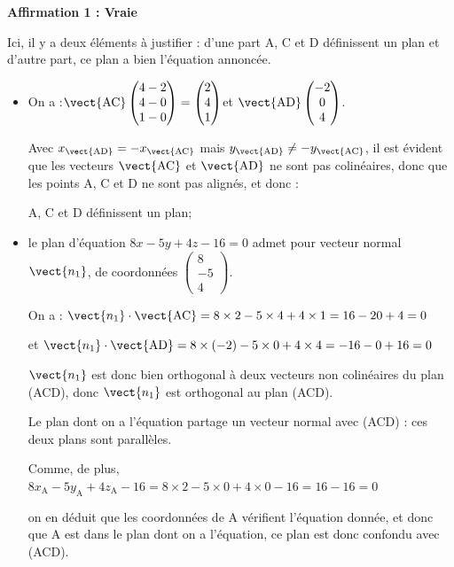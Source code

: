 \medskip

\textbf{Affirmation 1 : Vraie}

Ici, il y a deux éléments à justifier : d'une part A, C et D définissent un plan et d'autre part, ce plan a bien l'équation annoncée.
\begin{itemize}[label=\textbullet]
	\item On a :\quad $\vect{\mathrm{AC}}\begin{pmatrix} 4 - 2\\4 - 0\\1-0 \end{pmatrix} = \begin{pmatrix} 2\\4\\1 \end{pmatrix}$\quad et \quad $\vect{\mathrm{AD}}\begin{pmatrix} -2\\0\\4\end{pmatrix}$.

	Avec $x_{\vect{\mathrm{AD}}} = -x_{\vect{\mathrm{AC}}}$ mais $y_{\vect{\mathrm{AD}} }\neq -y_{\vect{\mathrm{AC}}}$, il est évident que les vecteurs $\vect{\mathrm{AC}}$ et $\vect{\mathrm{AD}}$ ne sont pas colinéaires, donc que les points A, C et D ne sont pas alignés, et donc :

	A, C et D définissent un plan;

	\item le plan d'équation $8x-5y+4z-16=0$ admet pour vecteur normal $\vect{n_1}$, de coordonnées $\begin{pmatrix}8\\-5\\4\end{pmatrix}$.

	On a : \quad $\vect{n_1}\cdot\vect{\mathrm{AC}} = 8\times 2 - 5 \times 4 + 4 \times 1 = 16 - 20 + 4 = 0$

	 et \quad $\vect{n_1}\cdot\vect{\mathrm{AD}} = 8\times (-2) - 5 \times 0 + 4 \times 4 = -16 - 0 + 16 = 0$

	 $\vect{n_1}$ est donc bien orthogonal à deux vecteurs non colinéaires du plan (ACD), donc $\vect{n_1}$ est orthogonal au plan (ACD).

	 Le plan dont on a l'équation partage un vecteur normal avec (ACD) : ces deux plans sont parallèles.

	 Comme, de plus, \quad $8x_\mathrm{A}-5y_\mathrm{A}+4z_\mathrm{A}-16 = 8\times 2 - 5 \times 0 +4\times 0 - 16 = 16 - 16 = 0$

	 on en déduit que les coordonnées de A vérifient l'équation donnée, et donc que A est dans le plan dont on a l'équation, ce plan est donc confondu avec (ACD).
\end{itemize}


